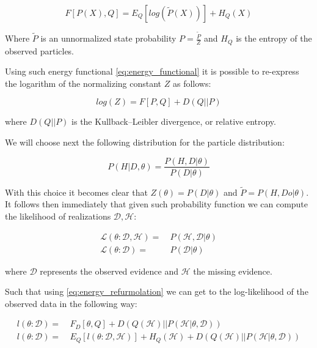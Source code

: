 \documentclass[11pt]{article}
\begin{document}
\begin{article}
\begin{equation} \label{eq:energy_functional}
F[P(X), Q] = E_Q[log (\tilde{P}(X))] + H_Q (X)
\end{equation}

Where \(\tilde{P}\) is an unnormalized state probability \(P =
  \frac{\tilde{P}}{Z}\) and \(H_Q\) is the entropy of the observed
particles. 

Using such energy functional \ref{eq:energy_functional} it is possible
to re-express the logarithm of the normalizing constant \(Z\) as
follows:

\begin{equation} \label{eq:energy_refurmolation}
log (Z) = F[P, Q] + D (Q||P)
\end{equation}  

where \(D(Q||P)\) is the Kullback–Leibler divergence, or relative
entropy.

We will choose next the following distribution for the particle
distribution:

\begin{equation} \label{eq:particle_distribution}
P (H | D, \theta) =   \frac{P (H, D| \theta)}{P (D| \theta)}
\end{equation}

With this choice it becomes clear that \(Z (\theta) = P (D|
  \theta)\) and \(\tilde{P} = P (H, Do| \theta)\). It
follows then immediately that given such probability function we
can compute the likelihood of realizations \(\mathscr{D}, \mathscr{H}\):

\begin{align} \label{eq:likelihood_particle}
\mathscr{L} (\theta: \mathscr{D}, \mathscr{H}) =& \  P (\mathscr{H}, \mathscr{D}| \theta)\\
\mathscr{L} (\theta: \mathscr{D}) =& \ P (\mathscr{D}| \theta)
\end{align}

where \(\mathscr{D}\) represents the observed evidence and
\(\mathscr{H}\) the missing evidence.

Such that using \ref{eq:energy_refurmolation} we can get to the
log-likelihood of the observed data in the following way:

\begin{align} \label{eq:likelihood_energy_functional_relation}
l (\theta: \mathscr{D}) =& \  F_D[\theta, Q] + D (Q (\mathscr{H}) || P (\mathscr{H}| \theta, \mathscr{D})) \\
l (\theta: \mathscr{D}) =& \  E_Q[l (\theta: \mathscr{D}, \mathscr{H})]+ H_Q (\mathscr {H}) + D (Q (\mathscr{H}) || P (\mathscr{H}| \theta, \mathscr{D}))
\end{align}


\end{article}
\end{document}

